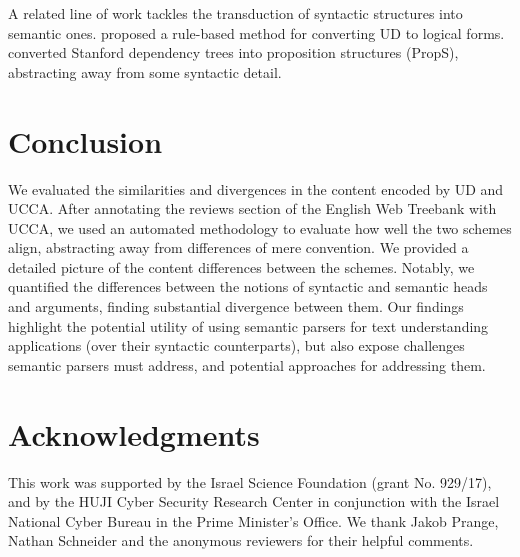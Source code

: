 \documentclass[11pt,a4paper,table]{article}
\begin{document}
A related line of work tackles the transduction of syntactic structures into semantic ones.
 proposed a rule-based method for converting UD
to logical forms.
 converted Stanford dependency trees into
proposition structures ({\sc PropS}), abstracting away from some syntactic detail.

\section{Conclusion}\label{sec:conclusion}

We evaluated the similarities and divergences in the content encoded by UD and UCCA. 
After annotating the reviews section of the English Web Treebank with UCCA,
  we used an automated methodology to evaluate how well the two schemes align,
  abstracting away from differences of mere convention.
We provided a detailed picture of the content differences between the schemes.
Notably, we quantified the differences between the notions of syntactic and semantic heads
  and arguments, finding substantial divergence between them.
Our findings highlight the potential utility of using semantic parsers for text understanding applications
  (over their syntactic counterparts), but also expose challenges semantic parsers must address,
  and potential approaches for addressing them.

\section*{Acknowledgments}

This work was supported by the Israel Science Foundation (grant No. 929/17),
and by the HUJI Cyber Security Research Center
in conjunction with the Israel National Cyber Bureau in the Prime Minister's Office.
We thank Jakob Prange, Nathan Schneider
and the anonymous reviewers for their helpful comments.




\end{document}
